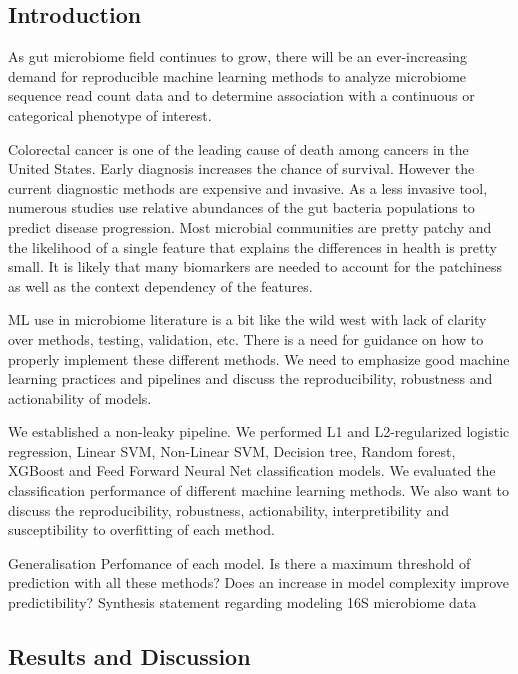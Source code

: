 \documentclass[11pt,]{article}
\begin{document}
\newpage

\subsection{Introduction}\label{introduction}

As gut microbiome field continues to grow, there will be an
ever-increasing demand for reproducible machine learning methods to
analyze microbiome sequence read count data and to determine association
with a continuous or categorical phenotype of interest.

Colorectal cancer is one of the leading cause of death among cancers in
the United States. Early diagnosis increases the chance of survival.
However the current diagnostic methods are expensive and invasive. As a
less invasive tool, numerous studies use relative abundances of the gut
bacteria populations to predict disease progression. Most microbial
communities are pretty patchy and the likelihood of a single feature
that explains the differences in health is pretty small. It is likely
that many biomarkers are needed to account for the patchiness as well as
the context dependency of the features.

ML use in microbiome literature is a bit like the wild west with lack of
clarity over methods, testing, validation, etc. There is a need for
guidance on how to properly implement these different methods. We need
to emphasize good machine learning practices and pipelines and discuss
the reproducibility, robustness and actionability of models.

We established a non-leaky pipeline. We performed L1 and L2-regularized
logistic regression, Linear SVM, Non-Linear SVM, Decision tree, Random
forest, XGBoost and Feed Forward Neural Net classification models. We
evaluated the classification performance of different machine learning
methods. We also want to discuss the reproducibility, robustness,
actionability, interpretibility and susceptibility to overfitting of
each method.

Generalisation Perfomance of each model. Is there a maximum threshold of
prediction with all these methods? Does an increase in model complexity
improve predictibility? Synthesis statement regarding modeling 16S
microbiome data

\subsection{Results and Discussion}\label{results-and-discussion}
\end{document}
